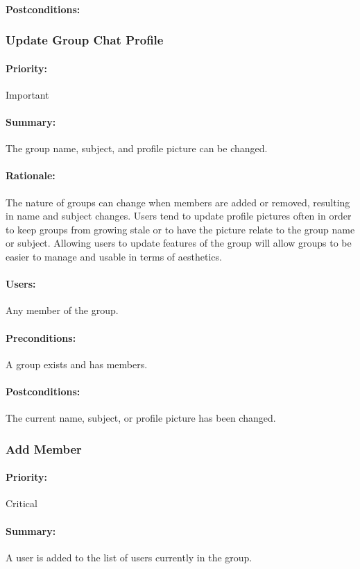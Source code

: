 \documentclass[11pt]{article}
\begin{document}
\paragraph{{Postconditions:}}
\subsubsection{Update Group Chat Profile} \label{UC-update-group}
\paragraph{Priority:} Important
\paragraph{Summary:}
The group name, subject, and profile picture can be changed.
\paragraph{Rationale:}
The nature of groups can change when members are added or removed, resulting in name and subject changes. Users tend to update profile pictures often in order to keep groups from growing stale or to have the picture relate to the group name or subject. Allowing users to update features of the group will allow groups to be easier to manage and usable in terms of aesthetics.
\paragraph{Users:}
Any member of the group.
\paragraph{Preconditions:}
A group exists and has members.
\paragraph{{Postconditions:}}
The current name, subject, or profile picture has been changed.
\subsubsection{Add Member} \label{UC-add-member}
\paragraph{Priority:} Critical
\paragraph{Summary:}
A user is added to the list of users currently in the group.
\end{document}
